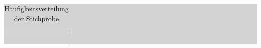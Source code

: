 \begin{table}[H]
\caption{Häufigkeitsverteilung der Stichprobe}
\setlength{\fboxsep}{0pt}%
\colorbox{lightgray}{%
%
\begin{tabular}{| c | c | c | c | c | c |}
\hline
\parbox[c][0.7in][c]{0.97in}{\smallskip\centering\textbf{}} & 
\parbox[c][0.7in][c]{0.97in}{\smallskip\centering\textbf{}} &
\parbox[c][0.7in][c]{0.97in}{\smallskip\centering\textbf{}} &
\parbox[c][0.7in][c]{0.97in}{\smallskip\centering\textbf{}} &
\parbox[c][0.7in][c]{0.97in}{\smallskip\centering\textbf{}} &
\parbox[c][0.7in][c]{0.97in}{\smallskip\centering\textbf{}}\\ \hline

\parbox[c][0.28in][c]{0.97in}{} &
\parbox[c][0.28in][c]{0.97in}{} &
\parbox[c][0.28in][c]{0.97in}{} &
\parbox[c][0.28in][c]{0.97in}{} &
\parbox[c][0.28in][c]{0.97in}{} &
\parbox[c][0.28in][c]{0.97in}{} \\ \hline

\parbox[c][0.28in][c]{0.97in}{} &
\parbox[c][0.28in][c]{0.97in}{} &
\parbox[c][0.28in][c]{0.97in}{} &
\parbox[c][0.28in][c]{0.97in}{} &
\parbox[c][0.28in][c]{0.97in}{} &
\parbox[c][0.28in][c]{0.97in}{} \\ \hline

\parbox[c][0.28in][c]{0.97in}{} &
\parbox[c][0.28in][c]{0.97in}{} &
\parbox[c][0.28in][c]{0.97in}{} &
\parbox[c][0.28in][c]{0.97in}{} &
\parbox[c][0.28in][c]{0.97in}{} &
\parbox[c][0.28in][c]{0.97in}{} \\ \hline

\parbox[c][0.28in][c]{0.97in}{} &
\parbox[c][0.28in][c]{0.97in}{} &
\parbox[c][0.28in][c]{0.97in}{} &
\parbox[c][0.28in][c]{0.97in}{} &
\parbox[c][0.28in][c]{0.97in}{} &
\parbox[c][0.28in][c]{0.97in}{} \\ \hline


\end{tabular}}
\end{table}
